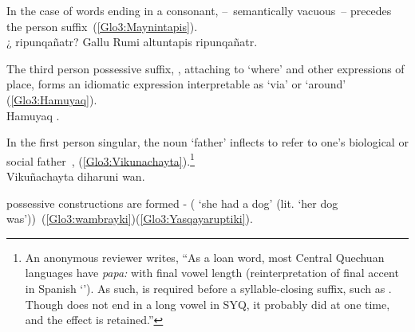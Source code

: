 \noindent
In the case of words ending in a consonant,  --~semantically vacuous~-- precedes the person suffix~(\ref{Glo3:Maynintapis}).\\

%
{¿ ripunqañatr? Gallu Rumi altuntapis ripunqañatr.}%
{}%
{}{}%

\noindent
The third person possessive suffix, , attaching to  ‘where’ and other expressions of place, forms an idiomatic expression interpretable as ‘via’ or ‘around’ (\ref{Glo3:Hamuyaq}).\\

%
{Hamuyaq .}%
{}%
{}{}%

\noindent
In the first person singular, the noun  ‘father’ inflects  to refer to one’s biological or social father~, (\ref{Glo3:Vikunachayta}).\footnote{An anonymous reviewer writes, “As a loan word, most Central Quechuan languages have \emph{papa:} with final vowel length (reinterpretation of final accent in Spanish ‘’). As such,  is required before a syllable-closing suffix, such as . Though  does not end in a long vowel in SYQ, it probably did at one time, and the effect is retained.”}\\

%
{Vikuñachayta diharuni wan.}%
{}%
{}{}%

\noindent
\SYQ{} possessive constructions are formed -  ( ‘she had a dog’ (lit. ‘her dog was’))~(\ref{Glo3:wambrayki})(\ref{Glo3:Yasqayaruptiki}).\\

